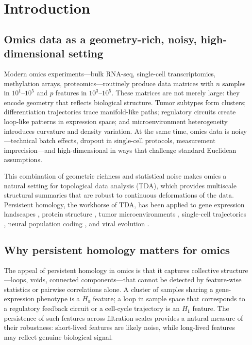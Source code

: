 \documentclass[11pt]{article}
\begin{document}
\section{Introduction}
\label{sec:introduction}

\subsection{Omics data as a geometry-rich, noisy, high-dimensional setting}

Modern omics experiments---bulk RNA-seq, single-cell transcriptomics, methylation arrays, proteomics---routinely produce data matrices with $n$ samples in $10^1$--$10^5$ and $p$ features in $10^3$--$10^5$.
These matrices are not merely large: they encode geometry that reflects biological structure.
Tumor subtypes form clusters; differentiation trajectories trace manifold-like paths; regulatory circuits create loop-like patterns in expression space; and microenvironment heterogeneity introduces curvature and density variation.
At the same time, omics data is noisy---technical batch effects, dropout in single-cell protocols, measurement imprecision---and high-dimensional in ways that challenge standard Euclidean assumptions.

This combination of geometric richness and statistical noise makes omics a natural setting for topological data analysis (TDA), which provides multiscale structural summaries that are robust to continuous deformations of the data.
Persistent homology, the workhorse of TDA, has been applied to gene expression landscapes \cite{rizvi2017}, protein structure \cite{xia2014}, tumor microenvironments \cite{vipond2021}, single-cell trajectories \cite{moon2019phate}, neural population coding \cite{giusti2015}, and viral evolution \cite{chan2013topology}.

\subsection{Why persistent homology matters for omics}

The appeal of persistent homology in omics is that it captures collective structure---loops, voids, connected components---that cannot be detected by feature-wise statistics or pairwise correlations alone.
A cluster of samples sharing a gene-expression phenotype is a $H_0$ feature; a loop in sample space that corresponds to a regulatory feedback circuit or a cell-cycle trajectory is an $H_1$ feature.
The persistence of such features across filtration scales provides a natural measure of their robustness: short-lived features are likely noise, while long-lived features may reflect genuine biological signal.
\end{document}
